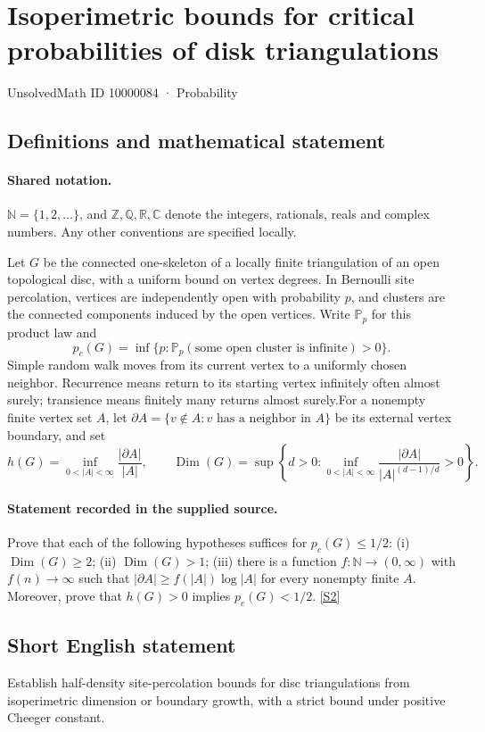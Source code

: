 \documentclass[11pt]{article}
\newcommand{\sref}[2]{\hyperlink{source:#1:#2}{[S#2]}}
\begin{document}
\setcounter{section}{10000083}
\section{Isoperimetric bounds for critical probabilities of disk triangulations}\label{10000084}
{\small\sffamily UnsolvedMath ID 10000084 · Probability}
\subsection{Definitions and mathematical statement}

\paragraph{Shared notation.}$\mathbb N=\{1,2,\ldots\}$, and $\mathbb Z,\mathbb Q,\mathbb R,\mathbb C$ denote the integers, rationals, reals and complex numbers. Any other conventions are specified locally.


Let $G$ be the connected one-skeleton of a locally finite triangulation of an open topological disc, with a uniform bound on vertex degrees. In Bernoulli site percolation, vertices are independently open with probability $p$, and clusters are the connected components induced by the open vertices. Write $\mathbb P_p$ for this product law and
\[p_c(G)=\inf\{p:\mathbb P_p(\text{some open cluster is infinite})>0\}.\]
Simple random walk moves from its current vertex to a uniformly chosen neighbor. Recurrence means return to its starting vertex infinitely often almost surely; transience means finitely many returns almost surely.For a nonempty finite vertex set $A$, let $\partial A=\{v\notin A:v\text{ has a neighbor in }A\}$ be its external vertex boundary, and set
\[h(G)=\inf_{0<|A|<\infty}\frac{|\partial A|}{|A|},\qquad
\operatorname{Dim}(G)=\sup\left\{d>0:\inf_{0<|A|<\infty}\frac{|\partial A|}{|A|^{(d-1)/d}}>0\right\}.\]
\paragraph{Statement recorded in the supplied source.}
Prove that each of the following hypotheses suffices for $p_c(G)\le1/2$: (i) $\operatorname{Dim}(G)\ge2$; (ii) $\operatorname{Dim}(G)>1$; (iii) there is a function $f:\mathbb N\to(0,\infty)$ with $f(n)\to\infty$ such that $|\partial A|\ge f(|A|)\log|A|$ for every nonempty finite $A$. Moreover, prove that $h(G)>0$ implies $p_c(G)<1/2$. \sref{10000084}{2}
\subsection{Short English statement}
Establish half-density site-percolation bounds for disc triangulations from isoperimetric dimension or boundary growth, with a strict bound under positive Cheeger constant.
\end{document}
